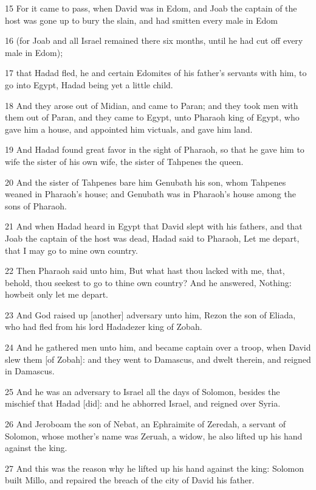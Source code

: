 \par 15 For it came to pass, when David was in Edom, and Joab the captain of the host was gone up to bury the slain, and had smitten every male in Edom
\par 16 (for Joab and all Israel remained there six months, until he had cut off every male in Edom);
\par 17 that Hadad fled, he and certain Edomites of his father's servants with him, to go into Egypt, Hadad being yet a little child.
\par 18 And they arose out of Midian, and came to Paran; and they took men with them out of Paran, and they came to Egypt, unto Pharaoh king of Egypt, who gave him a house, and appointed him victuals, and gave him land.
\par 19 And Hadad found great favor in the sight of Pharaoh, so that he gave him to wife the sister of his own wife, the sister of Tahpenes the queen.
\par 20 And the sister of Tahpenes bare him Genubath his son, whom Tahpenes weaned in Pharaoh's house; and Genubath was in Pharaoh's house among the sons of Pharaoh.
\par 21 And when Hadad heard in Egypt that David slept with his fathers, and that Joab the captain of the host was dead, Hadad said to Pharaoh, Let me depart, that I may go to mine own country.
\par 22 Then Pharaoh said unto him, But what hast thou lacked with me, that, behold, thou seekest to go to thine own country? And he answered, Nothing: howbeit only let me depart.
\par 23 And God raised up [another] adversary unto him, Rezon the son of Eliada, who had fled from his lord Hadadezer king of Zobah.
\par 24 And he gathered men unto him, and became captain over a troop, when David slew them [of Zobah]: and they went to Damascus, and dwelt therein, and reigned in Damascus.
\par 25 And he was an adversary to Israel all the days of Solomon, besides the mischief that Hadad [did]: and he abhorred Israel, and reigned over Syria.
\par 26 And Jeroboam the son of Nebat, an Ephraimite of Zeredah, a servant of Solomon, whose mother's name was Zeruah, a widow, he also lifted up his hand against the king.
\par 27 And this was the reason why he lifted up his hand against the king: Solomon built Millo, and repaired the breach of the city of David his father.
